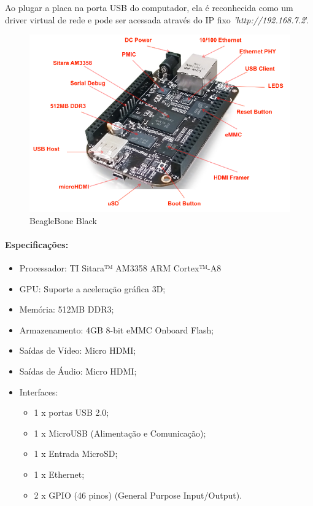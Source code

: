 Ao plugar a placa na porta USB do computador, ela é reconhecida como
um driver virtual de rede e pode ser acessada através do IP fixo\emph{
'http://192.168.7.2}'.

\begin{figure}[h]
\begin{centering}
\includegraphics[width=1\linewidth]{Imagens/Cap_2/beaglebone}
\par\end{centering}
\caption{BeagleBone Black \cite{img:BeagleBone} \label{fig:beaglebone}}
\end{figure}


\paragraph*{Especificações:}
\begin{itemize}
\item Processador: TI Sitara™ AM3358 ARM\textregistered{} Cortex™-A8
\item GPU: Suporte a aceleração gráfica 3D;
\item Memória: 512MB DDR3;
\item Armazenamento: 4GB 8-bit eMMC Onboard Flash;
\item Saídas de Vídeo: Micro HDMI;
\item Saídas de Áudio: Micro HDMI;
\item Interfaces:

\begin{itemize}
\item 1 x portas USB 2.0;
\item 1 x MicroUSB (Alimentação e Comunicação);
\item 1 x Entrada MicroSD;
\item 1 x Ethernet;
\item 2 x GPIO (46 pinos) (General Purpose Input/Output).
\end{itemize}
\end{itemize}

